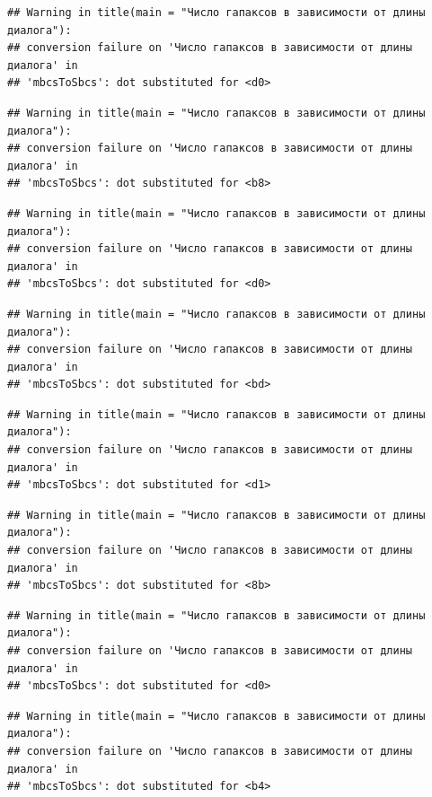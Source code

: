 \documentclass[
]{book}
\theoremstyle{definition}
\theoremstyle{definition}
\theoremstyle{definition}
\theoremstyle{definition}
\theoremstyle{remark}
\begin{document}
\begin{verbatim}
## Warning in title(main = "Число гапаксов в зависимости от длины диалога"):
## conversion failure on 'Число гапаксов в зависимости от длины диалога' in
## 'mbcsToSbcs': dot substituted for <d0>
\end{verbatim}

\begin{verbatim}
## Warning in title(main = "Число гапаксов в зависимости от длины диалога"):
## conversion failure on 'Число гапаксов в зависимости от длины диалога' in
## 'mbcsToSbcs': dot substituted for <b8>
\end{verbatim}

\begin{verbatim}
## Warning in title(main = "Число гапаксов в зависимости от длины диалога"):
## conversion failure on 'Число гапаксов в зависимости от длины диалога' in
## 'mbcsToSbcs': dot substituted for <d0>
\end{verbatim}

\begin{verbatim}
## Warning in title(main = "Число гапаксов в зависимости от длины диалога"):
## conversion failure on 'Число гапаксов в зависимости от длины диалога' in
## 'mbcsToSbcs': dot substituted for <bd>
\end{verbatim}

\begin{verbatim}
## Warning in title(main = "Число гапаксов в зависимости от длины диалога"):
## conversion failure on 'Число гапаксов в зависимости от длины диалога' in
## 'mbcsToSbcs': dot substituted for <d1>
\end{verbatim}

\begin{verbatim}
## Warning in title(main = "Число гапаксов в зависимости от длины диалога"):
## conversion failure on 'Число гапаксов в зависимости от длины диалога' in
## 'mbcsToSbcs': dot substituted for <8b>
\end{verbatim}

\begin{verbatim}
## Warning in title(main = "Число гапаксов в зависимости от длины диалога"):
## conversion failure on 'Число гапаксов в зависимости от длины диалога' in
## 'mbcsToSbcs': dot substituted for <d0>
\end{verbatim}

\begin{verbatim}
## Warning in title(main = "Число гапаксов в зависимости от длины диалога"):
## conversion failure on 'Число гапаксов в зависимости от длины диалога' in
## 'mbcsToSbcs': dot substituted for <b4>
\end{verbatim}
\end{document}
